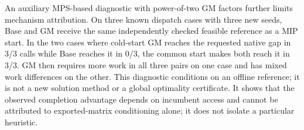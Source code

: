 An auxiliary MPS-based diagnostic with power-of-two GM factors further
limits mechanism attribution.
On three known dispatch cases with three new seeds, Base and GM receive the
same independently checked feasible reference as a MIP start. In the two cases
where cold-start GM reaches the requested native gap in 3/3 calls while Base
reaches it in 0/3, the common start makes both reach it in 3/3. GM then requires
more work in all three pairs on one case and has mixed work differences on the
other. This diagnostic conditions on an offline reference; it is not a new
solution method or a global optimality certificate. It shows that the observed
completion advantage depends on incumbent access and cannot be attributed to
exported-matrix conditioning alone; it does not isolate a particular heuristic.

